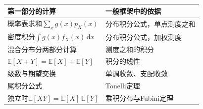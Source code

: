 \begin{BookInlineTable}
  \centering
  \caption{第一部分的期望计算及其一般依据}
  \label{tab:pspace-formula-sources}
  \begin{tabular}{ll}
    \toprule
    第一部分的计算 & 一般框架中的依据 \\
    \midrule
    概率表求和$\sum_xg(x)p_X(x)$ & 分布积分公式，单点测度之和 \\
    密度积分$\int g(x)f_X(x)\,\mathrm{d}x$ & 分布积分公式，加权测度 \\
    混合分布分两部分计算 & 测度之和的积分 \\
    $\mathbb{E}[X+Y]=\mathbb{E}[X]+\mathbb{E}[Y]$ & 积分的线性 \\
    级数与期望交换 & 单调收敛、支配收敛 \\
    尾积分公式 & Tonelli定理 \\
    独立时$\mathbb{E}[XY]=\mathbb{E}[X]\,\mathbb{E}[Y]$ & 乘积分布与Fubini定理 \\
    \bottomrule
  \end{tabular}
\end{BookInlineTable}
